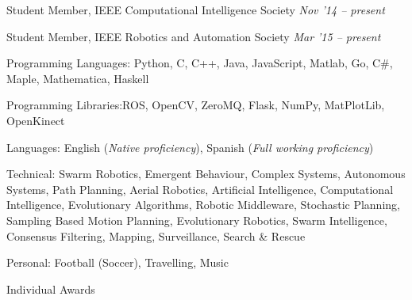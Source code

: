 \documentclass[10pt,a4paper]{article} %
\begin{document}
\headedsection
{Student Member, IEEE Computational Intelligence Society}
{\emph{Nov '14 -- present}} {
}

\headedsection
{Student Member, IEEE Robotics and Automation Society}
{\emph{Mar '15 -- present}} {
}



\inlineheadsection
{Programming Languages:}
{Python, C, C++, Java, JavaScript, Matlab, Go, C\#, Maple, Mathematica, Haskell}

\inlineheadsection
{Programming Libraries:}{ROS, OpenCV, ZeroMQ, Flask, NumPy, MatPlotLib, OpenKinect}

\inlineheadsection
{Languages:}
{English (\emph{Native proficiency}), Spanish (\emph{Full working proficiency})\newline}

\spacedhrule{1.6em}{-0.4em}

\inlineheadsection
{Technical:} {Swarm Robotics, Emergent Behaviour, Complex Systems, Autonomous
    Systems, Path Planning, Aerial Robotics, Artificial Intelligence,
    Computational Intelligence, Evolutionary Algorithms, Robotic Middleware,
    Stochastic Planning, Sampling Based Motion Planning, Evolutionary Robotics,
Swarm Intelligence, Consensus Filtering, Mapping, Surveillance, Search \&
Rescue}

\inlineheadsection
{Personal:}
{Football (Soccer), Travelling, Music}

\spacedhrule{1.6em}{-0.4em}


\headedsection %
{Individual Awards}
{}{}
\end{document}
